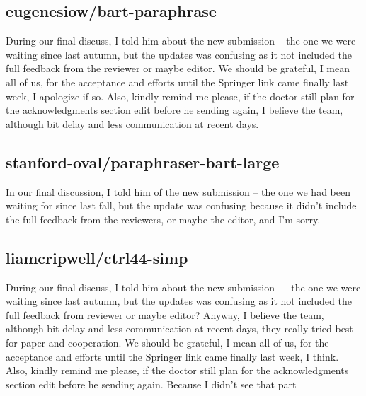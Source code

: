 \subsection*{eugenesiow/bart-paraphrase}
During our final discuss, I told him about the new submission -- the one we were waiting since last autumn, but the updates was confusing as it not included the full feedback from the reviewer or maybe editor. We should be grateful, I mean all of us, for the acceptance and efforts until the Springer link came finally last week, I apologize if so. Also, kindly remind me please, if the doctor still plan for the acknowledgments section edit before he sending again, I believe the team, although bit delay and less communication at recent days.

\subsection*{stanford-oval/paraphraser-bart-large}
In our final discussion, I told him of the new submission -- the one we had been waiting for since last fall, but the update was confusing because it didn't include the full feedback from the reviewers, or maybe the editor, and I'm sorry.

\subsection*{liamcripwell/ctrl44-simp}
 During our final discuss, I told him about the new submission — the one we were waiting since last autumn, but the updates was confusing as it not included the full feedback from reviewer or maybe editor? Anyway, I believe the team, although bit delay and less communication at recent days, they really tried best for paper and cooperation. We should be grateful, I mean all of us, for the acceptance and efforts until the Springer link came finally last week, I think. Also, kindly remind me please, if the doctor still plan for the acknowledgments section edit before he sending again. Because I didn’t see that part


